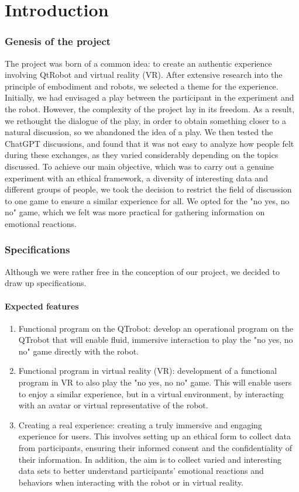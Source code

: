 \chapter{Introduction}
\subsection{Genesis of the project}
The project was born of a common idea: to create an authentic experience involving QtRobot and virtual reality (VR). After extensive research into the principle of embodiment and robots, we selected a theme for the experience. Initially, we had envisaged a play between the participant in the experiment and the robot. However, the complexity of the project lay in its freedom. As a result, we rethought the dialogue of the play, in order to obtain something closer to a natural discussion, so we abandoned the idea of a play. We then tested the ChatGPT discussions, and found that it was not easy to analyze how people felt during these exchanges, as they varied considerably depending on the topics discussed. To achieve our main objective, which was to carry out a genuine experiment with an ethical framework, a diversity of interesting data and different groups of people, we took the decision to restrict the field of discussion to one game to ensure a similar experience for all. We opted for the "no yes, no no" game, which we felt was more practical for gathering information on emotional reactions.\\

\subsection{Specifications}
Although we were rather free in the conception of our project, we decided to draw up specifications.\\

\subsubsection{Expected features}
\begin{enumerate}
\item Functional program on the QTrobot: develop an operational program on the QTrobot that will enable fluid, immersive interaction to play the "no yes, no no" game directly with the robot.

\item Functional program in virtual reality (VR): development of a functional program in VR to also play the "no yes, no no" game. This will enable users to enjoy a similar experience, but in a virtual environment, by interacting with an avatar or virtual representative of the robot.

\item Creating a real experience: creating a truly immersive and engaging experience for users. This involves setting up an ethical form to collect data from participants, ensuring their informed consent and the confidentiality of their information. In addition, the aim is to collect varied and interesting data sets to better understand participants' emotional reactions and behaviors when interacting with the robot or in virtual reality.
\end{enumerate}
